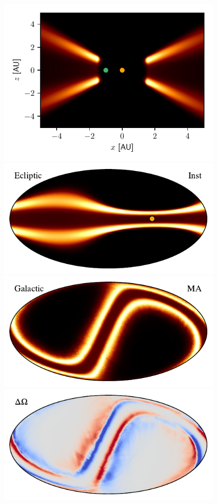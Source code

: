 \documentclass[twocolumn]{aa}
\begin{document}
\begin{figure}
  \includegraphics[width=0.95\columnwidth]{figs/band3_dens.pdf}\\
  \includegraphics[width=0.95\columnwidth]{figs/band3_inst.pdf}\\
  \includegraphics[width=0.95\columnwidth]{figs/band3_ma.pdf}\\
  \includegraphics[width=0.95\columnwidth]{figs/band3_omega.pdf}

\end{figure}
\end{document}

